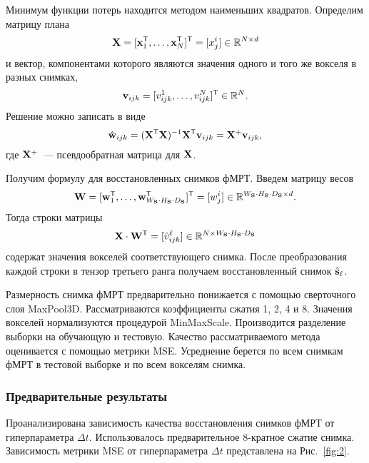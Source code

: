 \documentclass[a4paper, 12pt]{article}
\begin{document}
	Минимум функции потерь находится методом наименьших квадратов. Определим матрицу плана
	\begin{equation}
		\label{eq10}
		\mathbf{X} = [\mathbf{x}_1^{\mathsf{T}}, \ldots, \mathbf{x}_N^{\mathsf{T}}]^{\mathsf{T}} = [x^i_j] \in \mathbb{R}^{N \times d}
	\end{equation}
	и вектор, компонентами которого являются значения одного и того же вокселя в разных снимках,
	\begin{equation}
		\label{eq11}
		\mathbf{v}_{ijk} = [v^1_{ijk}, \ldots, v^N_{ijk}]^{\mathsf{T}} \in \mathbb{R}^N.
	\end{equation}
	Решение можно записать в виде
	\begin{equation}
		\label{eq12}
		\hat{\mathbf{w}}_{ijk} = (\mathbf{X}^{\mathsf{T}} \mathbf{X})^{-1} \mathbf{X}^{\mathsf{T}} \mathbf{v}_{ijk} = \mathbf{X}^{+} \mathbf{v}_{ijk},
	\end{equation}
	где $\mathbf{X}^{+}$~--- псевдообратная матрица для $\mathbf{X}$.
	
	Получим формулу для восстановленных снимков фМРТ. Введем матрицу весов
	\begin{equation}
		\label{eq13}
		\mathbf{W} = [\mathbf{w}_1^{\mathsf{T}}, \ldots, \mathbf{w}_{W_{\mathbf{S}} \cdot H_{\mathbf{S}} \cdot D_{\mathbf{S}}}^{\mathsf{T}}]^{\mathsf{T}} = [w^i_j] \in \mathbb{R}^{W_{\mathbf{S}} \cdot H_{\mathbf{S}} \cdot D_{\mathbf{S}} \times d}.
	\end{equation}
	Тогда строки матрицы
	\begin{equation}
		\label{eq14}
		\mathbf{X} \cdot \mathbf{W}^{\mathsf{T}} = [\hat{v}^{\ell}_{ijk}] \in \mathbb{R}^{N \times W_{\mathbf{S}} \cdot H_{\mathbf{S}} \cdot D_{\mathbf{S}}}
	\end{equation}
	содержат значения вокселей соответствующего снимка. После преобразования каждой строки в тензор 
	третьего ранга получаем восстановленный снимок $\hat{\mathbf{s}}_{\ell}$.

	Размерность снимка фМРТ предварительно понижается с помощью сверточного слоя MaxPool3D.
	Рассматриваются коэффициенты сжатия 1, 2, 4 и 8.
	Значения вокселей нормализуются процедурой MinMaxScale.
	Производится разделение выборки на обучающую и тестовую.
	Качество рассматриваемого метода оценивается с помощью метрики MSE.
	Усреднение берется по всем снимкам фМРТ в тестовой выборке и по всем вокселям снимка.

\subsubsection{Предварительные результаты}

	Проанализирована зависимость качества восстановления снимков фМРТ от гиперпараметра $\Delta t$.
	Использовалось предварительное 8-кратное сжатие снимка.
	Зависимость метрики MSE от гиперпараметра $\Delta t$ представлена на Рис.~\ref{fig:2}.
\end{document}
